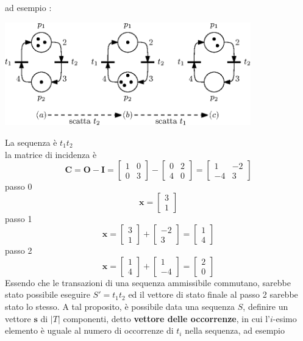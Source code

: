 \documentclass[10pt, letterpaper]{report}
\begin{document}
ad esempio :
\begin{center}
    \includegraphics[width=0.8\textwidth]{images/seqScatti.eps}
\end{center}
La sequenza è $t_1t_2$ \\ 
la matrice di incidenza è $$\mathbf C =\mathbf O - \mathbf I = \begin{bmatrix}
    1&0\\0&3
\end{bmatrix}-\begin{bmatrix}
    0&2\\4&0
\end{bmatrix}=\begin{bmatrix}
    1&-2\\-4&3
\end{bmatrix}$$
passo 0 
$$ \mathbf x = \begin{bmatrix}
    3\\ 1
\end{bmatrix}$$
passo 1 
$$ \mathbf x = \begin{bmatrix}
    3\\ 1
\end{bmatrix}+ \begin{bmatrix}
    -2\\ 3
\end{bmatrix}=\begin{bmatrix}
    1\\ 4
\end{bmatrix}$$
passo 2 
$$ \mathbf x = \begin{bmatrix}
    1\\ 4
\end{bmatrix}+ \begin{bmatrix}
    1\\ -4
\end{bmatrix}=\begin{bmatrix}
    2\\ 0
\end{bmatrix}$$
Essendo che le transazioni di una sequenza ammissibile commutano, sarebbe stato possibile eseguire $S'=t_1t_2$ ed il vettore di stato finale al passo 2 sarebbe stato lo stesso. A tal proposito, è possibile data una sequenza $S$, definire un vettore $\mathbf s$ di $|T|$ componenti, detto \textbf{vettore delle occorrenze}, in cui l'$i$-esimo elemento è uguale al numero di occorrenze di $t_i$ nella sequenza, ad esempio 
\end{document}
